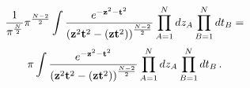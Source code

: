 $$
     {1\over \pi^{N\over 2}}
             {\pi }^{N-2\over 2}
        \int  
           {
      e^{-{\bf z}^2-{\bf t}^2}
                 \over
        \left({\bf z}^2{\bf t}^2-
\left({\bf z}{\bf t}^2\right)\right)^{N-2\over 2}
              }
         \prod_{A=1}^{N} dz_A
         \prod_{B=1}^{N} dt_B=    
               $$
                $$
              \pi \int  
           {
      e^{-{\bf z}^2-{\bf t}^2}
                 \over
        \left({\bf z}^2{\bf t}^2-
\left({\bf z}{\bf t}^2\right)\right)^{N-2\over 2}
              }
         \prod_{A=1}^{N} dz_A
         \prod_{B=1}^{N} dt_B\,.
           $$


\bye      
